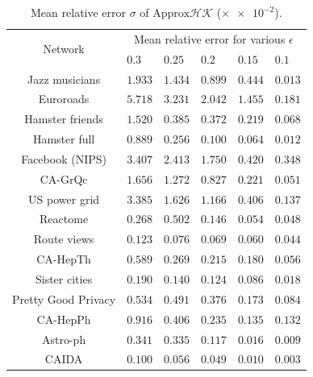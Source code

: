 \documentclass[10pt,twocolumn,twoside]{IEEEtran}
\begin{document}
\begin{table}[htbp]
    \tabcolsep=8pt
    \centering
    \fontsize{8.0}{8.8}\selectfont
    \begin{threeparttable}
        \caption{Mean relative error \(\sigma\) of \(\text{Approx}\mathcal{HK}\) (\(\times \num{e-2}\)).} %
        \label{tab:accuracy}
        \begin{tabularx}{8.5cm}{c p{0.5cm} p{0.5cm} p{0.5cm} p{0.5cm} p{0.5cm}}
            \toprule[1pt]
            \multirow{2}{*}{Network} &
            \multicolumn{5}{c}{Mean relative error for various \(\epsilon\)}                     \\
            \cmidrule{2-6}
                                     & \(0.3\)   & \(0.25\)  & \(0.2\)   & \(0.15\)  & \(0.1\)   \\
            \midrule
            Jazz musicians           & \(1.933\) & \(1.434\) & \(0.899\) & \(0.444\) & \(0.013\) \\
            Euroroads                & \(5.718\) & \(3.231\) & \(2.042\) & \(1.455\) & \(0.181\) \\
            Hamster friends          & \(1.520\) & \(0.385\) & \(0.372\) & \(0.219\) & \(0.068\) \\
            Hamster full             & \(0.889\) & \(0.256\) & \(0.100\) & \(0.064\) & \(0.012\) \\
            Facebook (NIPS)          & \(3.407\) & \(2.413\) & \(1.750\) & \(0.420\) & \(0.348\) \\
            CA-GrQc                  & \(1.656\) & \(1.272\) & \(0.827\) & \(0.221\) & \(0.051\) \\
            US power grid            & \(3.385\) & \(1.626\) & \(1.166\) & \(0.406\) & \(0.137\) \\
            Reactome                 & \(0.268\) & \(0.502\) & \(0.146\) & \(0.054\) & \(0.048\) \\
            Route views              & \(0.123\) & \(0.076\) & \(0.069\) & \(0.060\) & \(0.044\) \\
            CA-HepTh                 & \(0.589\) & \(0.269\) & \(0.215\) & \(0.180\) & \(0.056\) \\
            Sister cities            & \(0.190\) & \(0.140\) & \(0.124\) & \(0.086\) & \(0.018\) \\
            Pretty Good Privacy      & \(0.534\) & \(0.491\) & \(0.376\) & \(0.173\) & \(0.084\) \\
            CA-HepPh                 & \(0.916\) & \(0.406\) & \(0.235\) & \(0.135\) & \(0.132\) \\
            Astro-ph                 & \(0.341\) & \(0.335\) & \(0.117\) & \(0.016\) & \(0.009\) \\
            CAIDA                    & \(0.100\) & \(0.056\) & \(0.049\) & \(0.010\) & \(0.003\) \\
            \bottomrule
        \end{tabularx}
    \end{threeparttable}
\end{table}
\end{document}
